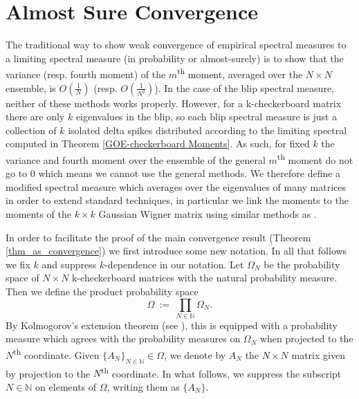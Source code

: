 \documentclass[11pt,reqno]{amsart}
\numberwithin{equation}{section}
\theoremstyle{plain}
\newcommand{\N}{\mathbb{N}}
\begin{document}
\section{Almost Sure Convergence}\label{sec:convergence}
\begin{comment}
\begin{enumerate}
    \item element of $\Omega$ is now $\{A_N\}_{N \in \N}$ where we suppress $N\in\N$ usually.
    \item matrix in $\Omega_N$ is $A_N$
    \item element of $\Omega^\N$ is $\overline{A} = \{A^{(i)}\}_{i \in \N}$ where we suppress $i \in \N$ usually and note that $A^{(i)}$ is actually a sequence. In fact, we have $A^{(i)} \in \Omega$ is a sequence of $N \times N$ matrices for $N$ increasing.
\end{enumerate}
\end{comment}



The traditional way to show weak convergence of empirical spectral measures to a limiting spectral measure (in probability or almost-surely) is to show that the variance (resp. fourth moment) of the $m$\textsuperscript{th} moment, averaged over the $N \times N$ ensemble, is $O(\frac{1}{N})$ (resp. $O\left(\frac{1}{N^2}\right)$). In the case of the blip spectral measure, neither of these methods works properly. However, for a k-checkerboard matrix there are only $k$ eigenvalues in the blip, so each blip spectral measure is just a collection of $k$ isolated delta spikes distributed according to the limiting spectral computed in Theorem \ref{GOE-checkerboard Moments}. As such, for fixed $k$ the variance and fourth moment over the ensemble of the general $m$\textsuperscript{th} moment do not go to $0$ which means we cannot use the general methods. We therefore define a modified spectral measure which averages over the eigenvalues of many matrices in order to extend standard techniques, in particular we link the moments to the moments of the $k\times k$ Gaussian Wigner matrix using similar methods as \cite{split}.

In order to facilitate the proof of the main convergence result (Theorem \ref{thm_as_convergence}) we first introduce some new notation. In all that follows we fix $k$ and suppress $k$-dependence in our notation. Let $\Omega_N$ be the probability space of $N \times N$ k-checkerboard matrices with the natural probability measure. Then we define the product probability space
\begin{equation}
\Omega\ :=\ \prod_{N \in \N} \Omega_N.
\end{equation}
By Kolmogorov's extension theorem (see \cite{Tao2}), this is equipped with a probability measure which agrees with the probability measures on $\Omega_N$ when projected to the $N$\textsuperscript{th} coordinate. Given $\{A_N\}_{N \in \N} \in \Omega$, we denote by $A_N$ the $N \times N$ matrix given by projection to the $N$\textsuperscript{th} coordinate. In what follows, we suppress the subscript $N \in \N$ on elements of $\Omega$, writing them as $\{A_N\}$.
\end{document}
